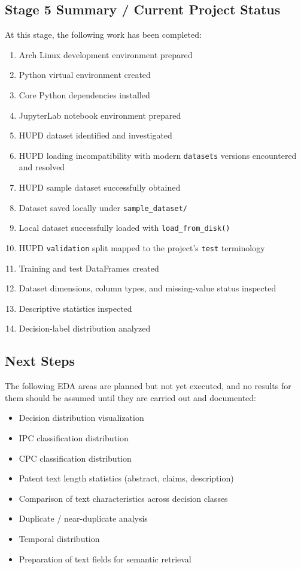 \documentclass[11pt]{article}
\begin{document}
\subsection{Stage 5 Summary / Current Project Status}

At this stage, the following work has been completed:

\begin{enumerate}
    \item Arch Linux development environment prepared
    \item Python virtual environment created
    \item Core Python dependencies installed
    \item JupyterLab notebook environment prepared
    \item HUPD dataset identified and investigated
    \item HUPD loading incompatibility with modern \texttt{datasets} versions encountered and resolved
    \item HUPD sample dataset successfully obtained
    \item Dataset saved locally under \texttt{sample\_dataset/}
    \item Local dataset successfully loaded with \texttt{load\_from\_disk()}
    \item HUPD \texttt{validation} split mapped to the project's \texttt{test} terminology
    \item Training and test DataFrames created
    \item Dataset dimensions, column types, and missing-value status inspected
    \item Descriptive statistics inspected
    \item Decision-label distribution analyzed
\end{enumerate}

\subsection{Next Steps}

The following EDA areas are planned but not yet executed, and no results for them should be assumed until they are carried out and documented:

\begin{itemize}
    \item Decision distribution visualization
    \item IPC classification distribution
    \item CPC classification distribution
    \item Patent text length statistics (abstract, claims, description)
    \item Comparison of text characteristics across decision classes
    \item Duplicate / near-duplicate analysis
    \item Temporal distribution
    \item Preparation of text fields for semantic retrieval
\end{itemize}
\end{document}
